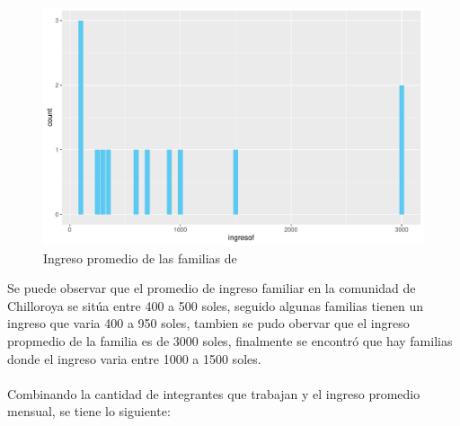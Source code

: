\documentclass[12pt]{article}\usepackage[]{graphicx}\usepackage[]{xcolor}
\makeatletter
\def\maxwidth{ %
  \ifdim\Gin@nat@width>\linewidth
    \linewidth
  \else
    \Gin@nat@width
  \fi
}
\newenvironment{kframe}{%
 \def\at@end@of@kframe{}%
 \ifinner\ifhmode%
  \def\at@end@of@kframe{\end{minipage}}%
  \begin{minipage}{\columnwidth}%
 \fi\fi%
 \def\FrameCommand##1{\hskip\@totalleftmargin \hskip-\fboxsep
 \colorbox{shadecolor}{##1}\hskip-\fboxsep
     \hskip-\linewidth \hskip-\@totalleftmargin \hskip\columnwidth}%
 \MakeFramed {\advance\hsize-\width
   \@totalleftmargin\z@ \linewidth\hsize
   \@setminipage}}%
 {\par\unskip\endMakeFramed%
 \at@end@of@kframe}
\newenvironment{knitrout}{}{} %
\makeatother
\begin{document}
	\begin{figure}[H]
	\centering
\begin{knitrout}
\color{fgcolor}\begin{kframe}


{\ttfamily\noindent\color{warningcolor}{\#\# Warning: NAs introducidos por coerción}}\end{kframe}
\includegraphics[width=\maxwidth]{figure/veinte-1} 
\end{knitrout}
	\caption{Ingreso promedio de las familias de \comunidad}
	\end{figure}
	Se puede observar que el promedio de ingreso familiar en la comunidad de Chilloroya se sitúa entre 400 a 500 soles, seguido algunas familias tienen un ingreso que varia 400 a 950 soles, tambien se pudo obervar que el ingreso propmedio de la familia es de 3000 soles, finalmente se encontró que hay familias donde el ingreso varia entre 1000 a 1500 soles.\\
	\\
	Combinando la cantidad de integrantes que trabajan y el ingreso promedio mensual, se tiene lo siguiente:
	
\end{document}
